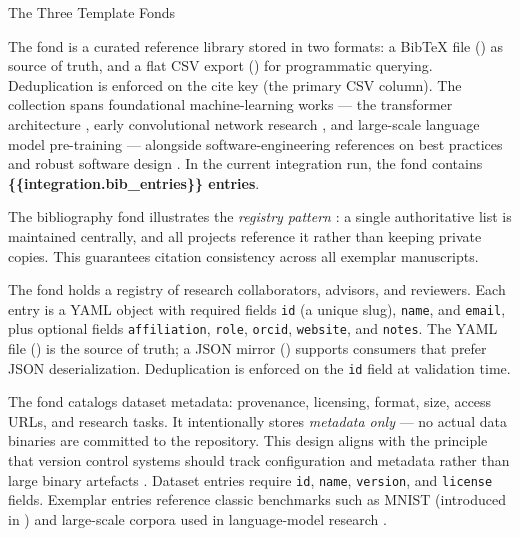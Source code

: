 \documentclass[
  ignorenonframetext,
]{beamer}
\begin{document}
\begin{frame}{The Three Template Fonds}
\protect{}\label{the-three-template-fonds}
\begin{block}{}
\protect{}\label{template_bibliography}
The  fond is a curated reference library
stored in two formats: a BibTeX file () as
source of truth, and a flat CSV export ()
for programmatic querying. Deduplication is enforced on the cite key
(the primary CSV column). The collection spans foundational
machine-learning works --- the transformer architecture
, early convolutional network research
, and large-scale language model pre-training
 --- alongside software-engineering references on
best practices  and robust software design
. In the current integration run, the fond contains
\textbf{\{\{integration.bib\_entries\}\} entries}.

The bibliography fond illustrates the \emph{registry pattern}
: a single authoritative list is maintained
centrally, and all projects reference it rather than keeping private
copies. This guarantees citation consistency across all exemplar
manuscripts.
\end{block}

\begin{block}{}
\protect{}\label{template_contacts}
The  fond holds a registry of research
collaborators, advisors, and reviewers. Each entry is a YAML object with
required fields \texttt{id} (a unique slug), \texttt{name}, and
\texttt{email}, plus optional fields \texttt{affiliation},
\texttt{role}, \texttt{orcid}, \texttt{website}, and \texttt{notes}. The
YAML file () is the source of truth; a JSON
mirror () supports consumers that prefer JSON
deserialization. Deduplication is enforced on the \texttt{id} field at
validation time.
\end{block}

\begin{block}{}
\protect{}\label{template_datasets}
The  fond catalogs dataset metadata:
provenance, licensing, format, size, access URLs, and research tasks. It
intentionally stores \emph{metadata only} --- no actual data binaries
are committed to the repository. This design aligns with the principle
that version control systems should track configuration and metadata
rather than large binary artefacts . Dataset
entries require \texttt{id}, \texttt{name}, \texttt{version}, and
\texttt{license} fields. Exemplar entries reference classic benchmarks
such as MNIST (introduced in ) and large-scale
corpora used in language-model research .
\end{block}
\end{frame}
\end{document}
